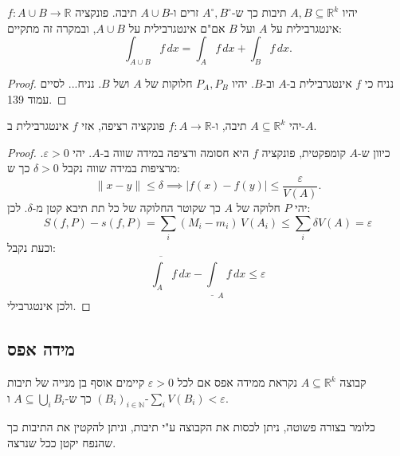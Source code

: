 \documentclass{tstextbook}
\begin{document}
\begin{proposition}
יהיו \(A,B\subseteq \mathbb{R}^k\) תיבות כך ש-\(A^{\circ},B^{\circ}\) זרים ו-\(A\cup B\) תיבה. פונקציה \(f: A\cup B\to\mathbb{R}\) אינטגרבילית על \(A\) ועל \(B\) אם"ם אינטגרבילית על \(A\cup B\), ובמקרה זה מתקיים:
$$\int_{A\cup B}f\,d x=\int_{A}f\,d x+\int_{B}f\,d x.$$

\end{proposition}
\begin{proof}
נניח כי \(f\) אינטגרבילית ב-\(A\) וב-\(B\). יהיו \(P_{A},P_{B}\) חלוקות של \(A\) ושל \(B\). נניח... לסיים עמוד 139.

\end{proof}
\begin{proposition}
יהי \(A\subseteq \mathbb{R}^k\) תיבה, ו-\(f:A\to\mathbb{R}\) פונקציה רציפה, אזי \(f\) אינטגרבילית ב-\(A\).

\end{proposition}
\begin{proof}
כיוון ש-\(A\) קומפקטית, פונקציה \(f\) היא חסומה ורציפה במידה שווה ב-\(A\).
יהי \(\varepsilon>0\). מרציפות במידה שווה נקבל \(\delta>0\) כך ש:
$$\|x-y\|\leq\delta\implies|f(x)-f(y)|\leq{\frac{\varepsilon}{V(A)}}.$$
יהי \(P\) חלוקה של \(A\) כך שקוטר החלוקה של כל תת תיבא קטן מ-\(\delta\). לכן:
$$S\left(f,P\right)-s(f,P)=\sum_{i}(M_{i}-m_{i})\,V(A_{i})\leq \sum_{i}\delta V(A)=\varepsilon$$
וכעת נקבל:
$${\overline{{\int_{A}}}}f\,d x-\underline{\int}_{A}f\,d x\leq\varepsilon$$
ולכן אינטגרבילי.

\end{proof}
\subsection{מידה אפס}

\begin{definition}
קבוצה \(A\subseteq \mathbb{R}^k\) נקראת ממידה אפס אם לכל \(\varepsilon>0\) קיימים אוסף בן מנייה של תיבות \((B_{i})_{i\in\mathbb{N}}\)  כך ש-\(A\subseteq \bigcup_{i}B_{i}\) ו-\(\sum_{i}V(B_{i})<\varepsilon\).

\end{definition}
כלומר בצורה פשוטה, ניתן לכסות את הקבוצה ע"י תיבות, וניתן להקטין את התיבות כך שהנפח יקטן ככל שנרצה.
\end{document}

